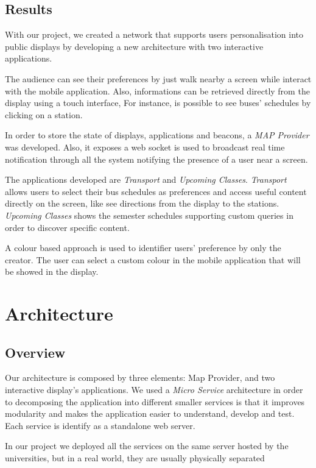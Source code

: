 \documentclass[]{usiinfbachelorproject}
\begin{document}
\subsection{Results}
With our project, we created a network that supports users personalisation into public displays by developing a new architecture with two interactive applications.

The audience can see their preferences by just walk nearby a screen while interact with the mobile application. Also, informations can be retrieved directly from the display using a touch interface, For instance, is possible to see buses' schedules by clicking on a station.

In order to store the state of displays, applications and beacons, a \emph{MAP Provider} was developed. Also, it exposes a web socket is used to broadcast real time notification through all the system notifying the presence of a user near a screen.

The applications developed are \emph{Transport} and \emph{Upcoming Classes}. \emph{Transport} allows users to select their bus schedules as preferences and access useful content directly on the screen, like see directions from the display to the stations.
\emph{Upcoming Classes} shows the semester schedules supporting custom queries in order to discover specific content.

A colour based approach is used to identifier users' preference by only the creator. The user can select a custom colour in the mobile application that will be showed in the display.

\section{Architecture}
\subsection{Overview}
Our architecture is composed by three elements: Map Provider, and two interactive display's applications. We used a \emph{Micro Service} architecture in order to decomposing the application into different smaller services is that it improves modularity and makes the application easier to understand, develop and test. Each service is identify as a standalone web server.

In our project we deployed all the services on the same server hosted by the universities, but in a real world, they are usually physically separated
\end{document}
